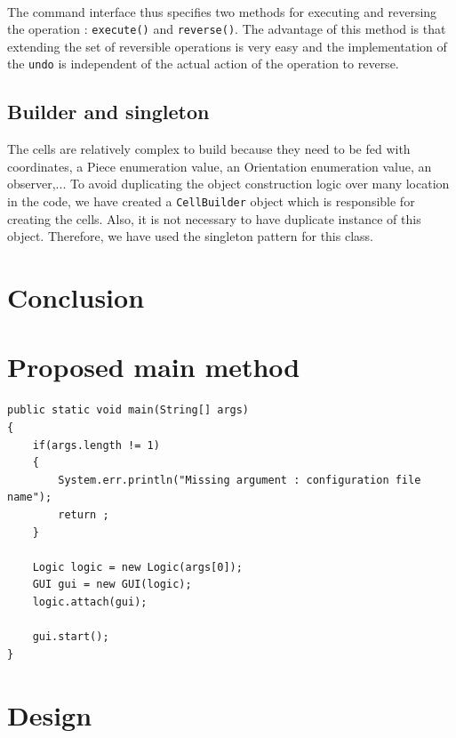 \documentclass[a4paper,11pt]{article}
\begin{document}
\paragraph{}
The command interface thus specifies two methods for executing and reversing the operation : \texttt{execute()} and \texttt{reverse()}. The advantage of this method is that extending the set of reversible operations is very easy and the implementation of the \texttt{undo} is independent of the actual action of the operation to reverse. 
\subsection{Builder and singleton}
The cells are relatively complex to build because they need to be fed with coordinates, a Piece enumeration value, an Orientation enumeration value, an observer,... To avoid duplicating the object construction logic over many location in the code, we have created a \texttt{CellBuilder} object which is responsible for creating the cells. Also, it is not necessary to have duplicate instance of this object. Therefore, we have used the singleton pattern for this class.
\section{Conclusion}
\newpage
\appendix
\section{Proposed main method}
\label{apx:main}
\begin{minipage}{0.75\linewidth}
\begin{lstlisting}[caption={\texttt{main()}}]
public static void main(String[] args)
{
	if(args.length != 1)
	{
		System.err.println("Missing argument : configuration file name");
		return ;
	}
	
	Logic logic = new Logic(args[0]);
	GUI gui = new GUI(logic);
	logic.attach(gui);
	
	gui.start();
}
\end{lstlisting}
\end{minipage}

\section{Design}
\end{document}

